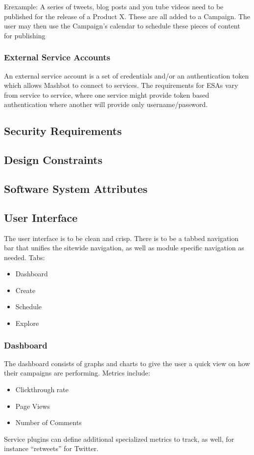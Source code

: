 \documentclass{article}
\begin{document}
				Erexample: A series of tweets, blog posts and you tube videos 
		need to be published for the release of a Product X.  These are all 
		added to a Campaign.  The user may then use the Campaign's calendar to 
		schedule these pieces of content for publishing
		\subsubsection{External Service Accounts} %
                An external service account is a set of credentials and/or an authentication token which allows Mashbot to connect to services.  The requirements for ESAs vary from service to service, where one service might provide token based authentication where another will provide only username/password.
	\subsection{Security Requirements} %
	\subsection{Design Constraints} %
	\subsection{Software System Attributes} %
	\subsection{User Interface} %
        The user interface is to be clean and crisp. There is to be a tabbed navigation bar that unifies the sitewide navigation, as well as module specific navigation as needed.
        Tabs:
        \begin{itemize}
        \item Dashboard
        \item Create
        \item Schedule
        \item Explore
        \end{itemize}
        \subsubsection{Dashboard}
        The dashboard consists of graphs and charts to give the user a quick view on how their campaigns are performing.
        Metrics include:
        \begin{itemize}
        \item Clickthrough rate
        \item Page Views
        \item Number of Comments
        \end{itemize}
        Service plugins can define additional specialized metrics to track, as well, for instance ``retweets'' for Twitter.
\end{document}
